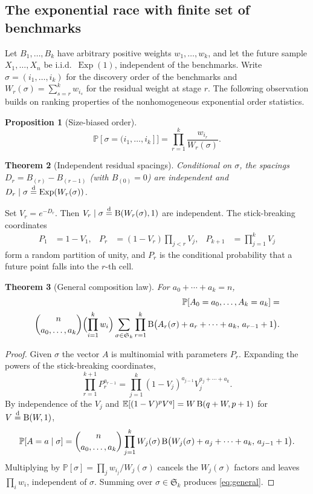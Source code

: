 \documentclass[11pt]{article}
\newcommand{\PP}{\mathbb{P}}
\newcommand{\EE}{\mathbb{E}}
\DeclareMathOperator{\Exp}{Exp}
\theoremstyle{plain}
\newtheorem{theorem}{Theorem}[section]
\newtheorem{proposition}[theorem]{Proposition}
\theoremstyle{definition}
\begin{document}
\subsection{The exponential race with finite set of benchmarks}
\label{sec:race}
 
 
Let \(B_1,\dots,B_k\) have arbitrary positive weights \(w_1,\dots,w_k\),  and let the future sample \(X_1,\dots,X_n\) be i.i.d.\ \(\Exp(1)\), independent of the benchmarks. Write \(\sigma=(i_1,\dots,i_k)\) for the discovery order of the benchmarks and \(W_r(\sigma)=\sum_{s=r}^k w_{i_s}\) for the residual weight at stage \(r\).
The following observation builds on  ranking properties of the nonhomogeneous exponential order statistics.
\begin{proposition}[Size-biased order]
\label{prop:size-biased}
\[
\PP[\sigma=(i_1,\dots,i_k]]=\prod_{r=1}^k\frac{w_{i_r}}{W_r(\sigma)}.
\]
\end{proposition}
 
\begin{theorem}[Independent residual spacings]
\label{thm:spacings}
Conditional on \(\sigma\), the spacings \(D_r=B_{(r)}-B_{(r-1)}\) (with \(B_{(0)}=0\)) are independent and \(D_r\mid\sigma\stackrel{\rm d}{=}\Exp(W_r(\sigma))\).
\end{theorem}
 
Set \(V_r=e^{-D_r}\). Then \(V_r\mid\sigma\stackrel{\rm d}{=}{\rm B}(W_r(\sigma),1)\) are independent. The stick-breaking coordinates
\begin{align*}
P_1&=1-V_1, &
P_r&=(1-V_r)\prod_{j<r}V_j, &
P_{k+1}&=\prod_{j=1}^k V_j
\end{align*}
form a random partition of unity, and \(P_r\) is the conditional probability that a future point falls into the \(r\)-th cell.
\begin{theorem}[General composition law]
\label{thm:general}
For \(a_0+\cdots+a_k=n\),
\begin{eqnarray}\nonumber
\label{eq:general}
\PP[A_0=a_0,\dots,A_k=a_k]
=\\
\binom{n}{a_0,\dots,a_k}\Bigl(\prod_{i=1}^k w_i\Bigr)
\sum_{\sigma\in\mathfrak{S}_k}
\prod_{r=1}^k {\rm B}\bigl(A_r(\sigma)+a_r+\cdots+a_k,\,a_{r-1}+1\bigr).
\end{eqnarray}
\end{theorem}
 
\begin{proof}
Given \(\sigma\) the vector \(A\) is multinomial with parameters \(P_r\). Expanding the powers of the stick-breaking coordinates,
\[
\prod_{r=1}^{k+1}P_r^{a_{r-1}}=\prod_{j=1}^k(1-V_j)^{a_{j-1}}V_j^{a_j+\cdots+a_k}.
\]
By independence of the \(V_j\) and \(\EE[(1-V)^p V^q]=W\,{\rm B}(q+W,p+1)\) for \(V\stackrel{\rm d}{=}{\rm B}(W,1)\),
\[
\PP[A=a\mid\sigma]=\binom{n}{a_0,\dots,a_k}\prod_{j=1}^kW_j(\sigma)\,{\rm B}\bigl(W_j(\sigma)+a_j+\cdots+a_k,\,a_{j-1}+1\bigr).
\]
Multiplying by \(\PP[\sigma]=\prod_j w_{i_j}/W_j(\sigma)\) cancels the \(W_j(\sigma)\) factors and leaves \(\prod_i w_i\), independent of \(\sigma\). Summing over \(\sigma\in\mathfrak{S}_k\) produces \eqref{eq:general}.
\end{proof}
 
\end{document}

